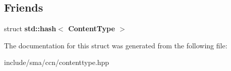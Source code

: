 \subsection*{Friends}
\begin{DoxyCompactItemize}
\item 
\hypertarget{structsma_1_1ContentType_a59a19f82340a4eb90039408f1d900d21}{struct {\bfseries std\-::hash$<$ Content\-Type $>$}}\label{structsma_1_1ContentType_a59a19f82340a4eb90039408f1d900d21}

\end{DoxyCompactItemize}


The documentation for this struct was generated from the following file\-:\begin{DoxyCompactItemize}
\item 
include/sma/ccn/contenttype.\-hpp\end{DoxyCompactItemize}
